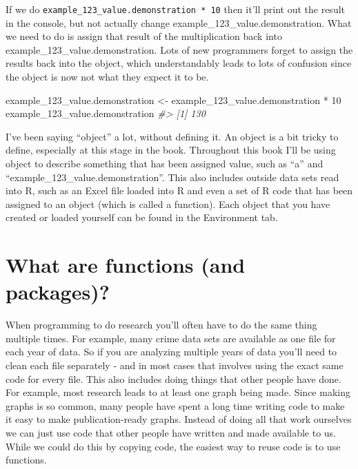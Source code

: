 \documentclass[
]{krantz}
\makeatletter
\newenvironment{Shaded}{\begin{snugshade}}{\end{snugshade}}
\newcommand{\CommentTok}[1]{\textcolor[rgb]{0.37,0.37,0.37}{\textit{#1}}}
\newcommand{\DecValTok}[1]{\textcolor[rgb]{0.06,0.06,0.06}{#1}}
\newcommand{\NormalTok}[1]{#1}
\newcommand{\OtherTok}[1]{\textcolor[rgb]{0.37,0.37,0.37}{#1}}
\newcommand{\SpecialCharTok}[1]{\textcolor[rgb]{0,0,0}{#1}}
\newenvironment{kframe}{%
\medskip{}
\setlength{\fboxsep}{.8em}
 \def\at@end@of@kframe{}%
 \ifinner\ifhmode%
  \def\at@end@of@kframe{\end{minipage}}%
  \begin{minipage}{\columnwidth}%
 \fi\fi%
 \def\FrameCommand##1{\hskip\@totalleftmargin \hskip-\fboxsep
 \colorbox{shadecolor}{##1}\hskip-\fboxsep
     \hskip-\linewidth \hskip-\@totalleftmargin \hskip\columnwidth}%
 \MakeFramed {\advance\hsize-\width
   \@totalleftmargin\z@ \linewidth\hsize
   \@setminipage}}%
 {\par\unskip\endMakeFramed%
 \at@end@of@kframe}
\renewenvironment{Shaded}{\begin{kframe}}{\end{kframe}}
\makeatother
\begin{document}
If we do \texttt{example\_123\_value.demonstration\ *\ 10}
then it'll print out the result in the console, but not
actually change example\_123\_value.demonstration. What we
need to do is assign that result of the multiplication back
into example\_123\_value.demonstration. Lots of new
programmers forget to assign the results back into the
object, which understandably leads to lots of confusion
since the object is now not what they expect it to be.

\begin{Shaded}
\begin{Highlighting}[]
\NormalTok{example\_123\_value.demonstration }\OtherTok{\textless{}{-}}\NormalTok{ example\_123\_value.demonstration }\SpecialCharTok{*} \DecValTok{10}
\NormalTok{example\_123\_value.demonstration}
\CommentTok{\#\textgreater{} [1] 130}
\end{Highlighting}
\end{Shaded}

I've been saying ``object'' a lot, without defining it. An
object is a bit tricky to define, especially at this stage
in the book. Throughout this book I'll be using object to
describe something that has been assigned value, such as
``a'' and ``example\_123\_value.demonstration''. This also
includes outside data sets read into R, such as an Excel
file loaded into R and even a set of R code that has been
assigned to an object (which is called a function). Each
object that you have created or loaded yourself can be found
in the Environment tab.

\hypertarget{functions-intro}{%
\section{What are functions (and
packages)?}\label{functions-intro}}

When programming to do research you'll often have to do the
same thing multiple times. For example, many crime data sets
are available as one file for each year of data. So if you
are analyzing multiple years of data you'll need to clean
each file separately - and in most cases that involves using
the exact same code for every file. This also includes doing
things that other people have done. For example, most
research leads to at least one graph being made. Since
making graphs is so common, many people have spent a long
time writing code to make it easy to make publication-ready
graphs. Instead of doing all that work ourselves we can just
use code that other people have written and made available
to us. While we could do this by copying code, the easiest
way to reuse code is to use functions.
\end{document}
